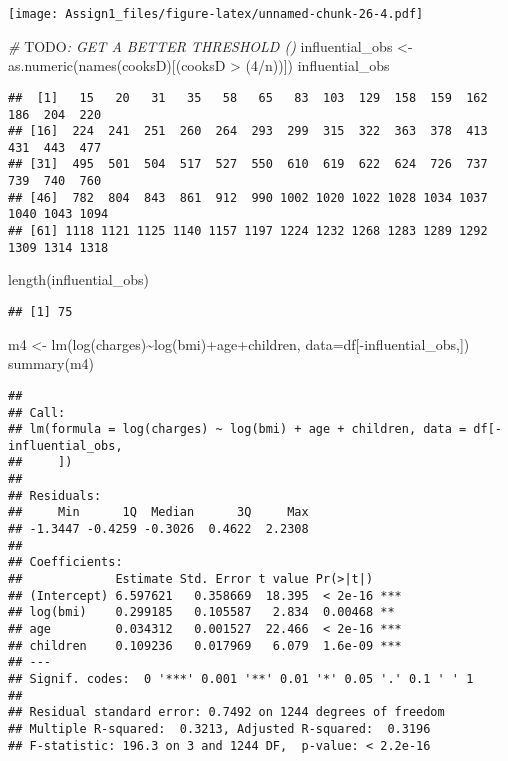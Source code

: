 \documentclass[
]{article}
\newenvironment{Shaded}{\begin{snugshade}}{\end{snugshade}}
\newcommand{\AlertTok}[1]{\textcolor[rgb]{0.94,0.16,0.16}{#1}}
\newcommand{\AttributeTok}[1]{\textcolor[rgb]{0.77,0.63,0.00}{#1}}
\newcommand{\CommentTok}[1]{\textcolor[rgb]{0.56,0.35,0.01}{\textit{#1}}}
\newcommand{\DecValTok}[1]{\textcolor[rgb]{0.00,0.00,0.81}{#1}}
\newcommand{\FunctionTok}[1]{\textcolor[rgb]{0.00,0.00,0.00}{#1}}
\newcommand{\NormalTok}[1]{#1}
\newcommand{\OtherTok}[1]{\textcolor[rgb]{0.56,0.35,0.01}{#1}}
\newcommand{\SpecialCharTok}[1]{\textcolor[rgb]{0.00,0.00,0.00}{#1}}
\begin{document}
\texttt{[image: Assign1\_files/figure-latex/unnamed-chunk-26-4.pdf]}

\begin{Shaded}
\begin{Highlighting}[]
\CommentTok{\# }\AlertTok{TODO}\CommentTok{: GET A BETTER THRESHOLD ()}
\NormalTok{influential\_obs }\OtherTok{\textless{}{-}} \FunctionTok{as.numeric}\NormalTok{(}\FunctionTok{names}\NormalTok{(cooksD)[(cooksD }\SpecialCharTok{\textgreater{}}\NormalTok{ (}\DecValTok{4}\SpecialCharTok{/}\NormalTok{n))])}
\NormalTok{influential\_obs}
\end{Highlighting}
\end{Shaded}

\begin{verbatim}
##  [1]   15   20   31   35   58   65   83  103  129  158  159  162  186  204  220
## [16]  224  241  251  260  264  293  299  315  322  363  378  413  431  443  477
## [31]  495  501  504  517  527  550  610  619  622  624  726  737  739  740  760
## [46]  782  804  843  861  912  990 1002 1020 1022 1028 1034 1037 1040 1043 1094
## [61] 1118 1121 1125 1140 1157 1197 1224 1232 1268 1283 1289 1292 1309 1314 1318
\end{verbatim}

\begin{Shaded}
\begin{Highlighting}[]
\FunctionTok{length}\NormalTok{(influential\_obs)}
\end{Highlighting}
\end{Shaded}

\begin{verbatim}
## [1] 75
\end{verbatim}

\begin{Shaded}
\begin{Highlighting}[]
\NormalTok{m4 }\OtherTok{\textless{}{-}} \FunctionTok{lm}\NormalTok{(}\FunctionTok{log}\NormalTok{(charges)}\SpecialCharTok{\textasciitilde{}}\FunctionTok{log}\NormalTok{(bmi)}\SpecialCharTok{+}\NormalTok{age}\SpecialCharTok{+}\NormalTok{children, }\AttributeTok{data=}\NormalTok{df[}\SpecialCharTok{{-}}\NormalTok{influential\_obs,])}
\FunctionTok{summary}\NormalTok{(m4)}
\end{Highlighting}
\end{Shaded}

\begin{verbatim}
## 
## Call:
## lm(formula = log(charges) ~ log(bmi) + age + children, data = df[-influential_obs, 
##     ])
## 
## Residuals:
##     Min      1Q  Median      3Q     Max 
## -1.3447 -0.4259 -0.3026  0.4622  2.2308 
## 
## Coefficients:
##             Estimate Std. Error t value Pr(>|t|)    
## (Intercept) 6.597621   0.358669  18.395  < 2e-16 ***
## log(bmi)    0.299185   0.105587   2.834  0.00468 ** 
## age         0.034312   0.001527  22.466  < 2e-16 ***
## children    0.109236   0.017969   6.079  1.6e-09 ***
## ---
## Signif. codes:  0 '***' 0.001 '**' 0.01 '*' 0.05 '.' 0.1 ' ' 1
## 
## Residual standard error: 0.7492 on 1244 degrees of freedom
## Multiple R-squared:  0.3213, Adjusted R-squared:  0.3196 
## F-statistic: 196.3 on 3 and 1244 DF,  p-value: < 2.2e-16
\end{verbatim}
\end{document}
